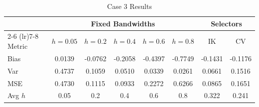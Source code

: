 \begin{table}[t!]
\centering
\caption{Case 3 Results}
\label{tab:case3}
\begin{tabular}{l ccccc cc}
\toprule
& \multicolumn{5}{c}{\textbf{Fixed Bandwidths}} & \multicolumn{2}{c}{\textbf{Selectors}} \\
\cmidrule(lr){2-6} \cmidrule(lr){7-8}
Metric & $h=0.05$ & $h=0.2$ & $h=0.4$ & $h=0.6$ & $h=0.8$ & IK & CV \\ 
\midrule
Bias & 0.0139 & -0.0762 & -0.2058 & -0.4397 & -0.7749 & -0.1431 & -0.1176 \\ 
Var & 0.4737 & 0.1059 & 0.0510 & 0.0339 & 0.0261 & 0.0661 & 0.1516 \\ 
MSE & 0.4730 & 0.1115 & 0.0933 & 0.2272 & 0.6266 & 0.0865 & 0.1651 \\ 
\addlinespace
Avg $h$ & 0.05 & 0.2 & 0.4 & 0.6 & 0.8 & 0.322 & 0.241 \\ 
\bottomrule
\end{tabular}
\end{table}
